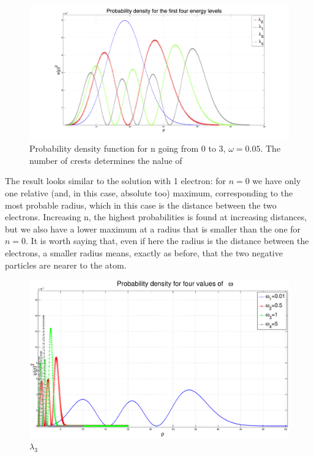 \documentclass {article}
\begin{document}
\begin{figure}[H]
	\centering
	\includegraphics[width=16cm]{ciccione}
	\caption{Probability density function for n going from 0 to 3,  $\omega=0.05$. The number of crests determines the nalue of }
	\label{22}
\end{figure}

The result looks similar to the solution with 1 electron: for $n=0$ we have only one relative (and, in this case, absolute too) maximum, corresponding to the most probable radius, which in this case is the distance between the two electrons. Increasing n, the highest probabilities is found at increasing distances, but we also have a lower maximum at a radius that is smaller than the one for $n=0$. It is worth saying that, even if here the radius is the distance between the electrons, a smaller radius means, exactly as before, that the two negative particles are nearer to the atom.
\\

\begin{figure}[H]
	\centering
	\includegraphics[width=16cm]{caccalog}
	\caption{$\lambda_3$}
	\label{25}
\end{figure}
\end{document}
